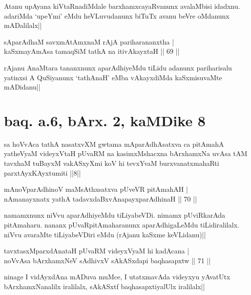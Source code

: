 \begin{artha}
Atanu upAyana kiVtaRnadiMdale barxhamxcayaRvanunx avalaMbisi idadxnu. 
adariMda `upeYmi' eMdu heVLuvudanunx biTuTx avanu beVre oMdanunx 
mADalilalx||
\end{artha}

\begin{shl}
sAparAdhaM savxmAtAmxnaM rAjA pariharananxtha | \\
kaSxmayAmAsa tamaqSiM tathA na itivAkayxtaH \hfill|| 69 || 
\end{shl}

\begin{artha}
rAjanu AnaMtara tananxnunx aparAdhiyeMdu tiLidu adanunx pariharisalu 
yatinxsi A QuSiyanunx `tathAnaH' eMba vAkayxdiMda kaSxmisuvaMte 
mADidanu||
\end{artha}


\section*{baq. a.6, bArx. 2, kaMDike 8}

\begin{shl}
sa hoVvAca tathA nasatxvXM gwtama mAparAdhAsatxva ca pitAmahA yatheVyaM videyxVtaH pUvaRM na kasimxMshacxna bArxhamxNa uvAsa tAM tavxhaM tuBayxM vakASxyXmi koV hi tevxYvaM burxvanatxmahaRti parxtAyxKAyxtumiti ||8||
\end{shl}

\begin{shl}
mAnoV\s parAdhinoV maMsAthxsatxva pUveVR pitAmahAH | \\
nAmanayxnatx yathA tadavxdaBxvAnapayxparAdhinaH \hfill|| 70 || 
\end{shl}

\begin{artha}
namamxnunx niVvu aparAdhiyeMdu tiLiyabeVDi. nimamx pUviRkarAda 
pitAmaharu. nananx pUvaRpitAmaharanunx aparAdhigaLeMdu tiLidiralilalx. 
niVvu avaraMte tiLiyabeVDiri eMdu (rAjanu kaSxme keVLidanu)||
\end{artha}

\begin{shl}
tavxtasxMparxdAnataH pUvaRM videyxVyaM hi kadAcana | \\
noVvAsa bArxhamxNeV sAdhivxV sAkASxdapi baqhasapxtw \hfill|| 71 || 
\end{shl}

\begin{artha}
ninage I vidAyxdAna mADuva muMce, I utatxmavAda videyxyu yAvatUtx 
bArxhamxNanalilx iralilalx, sAkASxtf baqhasapxtiyalUlx iralilalx||
\end{artha}

